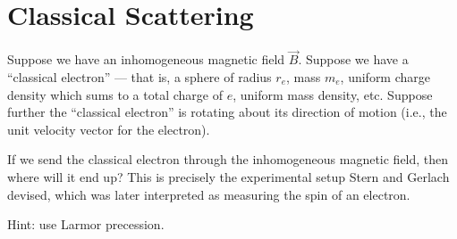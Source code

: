 \section{Classical Scattering}



\begin{exercise}
Suppose we have an inhomogeneous magnetic field $\vec{B}$.
Suppose we have a ``classical electron'' --- that is, a sphere of radius
$r_{e}$, mass $m_{e}$, uniform charge density which sums to a total
charge of $e$, uniform mass density, etc. Suppose further the
``classical electron'' is rotating about its direction of motion (i.e.,
the unit velocity vector for the electron).

If we send the classical electron through the inhomogeneous magnetic
field, then where will it end up? This is precisely the experimental
setup Stern and Gerlach devised, which was later interpreted as
measuring the spin of an electron.
\end{exercise}

\begin{remark}
Hint: use Larmor precession.
\end{remark}